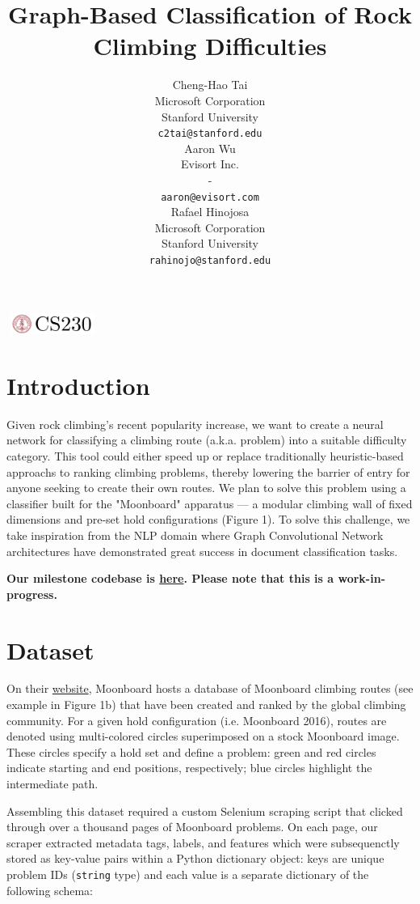 \documentclass{article}
\title{Graph-Based Classification of Rock Climbing Difficulties}
\author{
  Cheng-Hao Tai \\
  Microsoft Corporation \\
  Stanford University \\
  \texttt{c2tai@stanford.edu} \\
  \And
  Aaron Wu \\
  Evisort Inc. \\
  - \\
  \texttt{aaron@evisort.com} \\
  \And
  Rafael Hinojosa \\
  Microsoft Corporation \\
  Stanford University \\
  \texttt{rahinojo@stanford.edu} \\
}
\begin{document}
\begin{center}
\includegraphics[width=3cm, height=0.7cm]{CS230}
\end{center}

\maketitle

\section{Introduction}	
Given rock climbing's recent popularity increase, we want to create a neural network for classifying a climbing route (a.k.a. problem) into a suitable difficulty category. This tool could either speed up or replace traditionally heuristic-based approachs to ranking climbing problems, thereby lowering the barrier of entry for anyone seeking to create their own routes. We plan to solve this problem using a classifier built for the "Moonboard" apparatus --- a modular climbing wall of fixed dimensions and pre-set hold configurations (Figure 1). To solve this challenge, we take inspiration from the NLP domain where Graph Convolutional Network architectures have demonstrated great success in document classification tasks.

{\small\textbf{Our milestone codebase is \href{https://github.com/gestalt-howard/moonGen}{here}. Please note that this is a work-in-progress.}}

\section{Dataset}
On their \href{https://moonboard.com/}{website}, Moonboard hosts a database of Moonboard climbing routes (see example in Figure 1b) that have been created and ranked by the global climbing community. For a given hold configuration (i.e. Moonboard 2016), routes are denoted using multi-colored circles superimposed on a stock Moonboard image. These circles specify a hold set and define a problem: green and red circles indicate starting and end positions, respectively; blue circles highlight the intermediate path.

Assembling this dataset required a custom Selenium scraping script that clicked through over a thousand pages of Moonboard problems. On each page, our scraper extracted metadata tags, labels, and features which were subsequenctly stored as key-value pairs within a Python dictionary object: keys are unique problem IDs (\texttt{string} type) and each value is a separate dictionary of the following schema:
\end{document}
